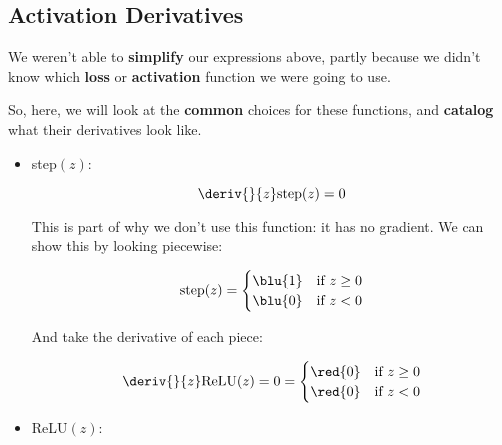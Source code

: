     \subsection*{Activation Derivatives}
    
        We weren't able to \textbf{simplify} our expressions above, partly because we didn't know which \textbf{loss} or \textbf{activation} function we were going to use.
        
        So, here, we will look at the \textbf{common} choices for these functions, and \textbf{catalog} what their derivatives look like.
        
        \begin{itemize}
            \item {} step$(z)$:
            
                \begin{equation}
                    \deriv{}{z} \text{step}(z) = 0
                \end{equation}
                
                This is part of why we don't use this function: it has no gradient. We can show this by looking piecewise:
                
                \begin{equation}
                    \text{step}(z) 
                    =
                    \begin{cases}
                      \blu{1} & \text{if $z \geq 0$}\\
                      \blu{0} & \text{if $z < 0$}
                    \end{cases}
                \end{equation}
                
                And take the derivative of each piece:
                
                \begin{equation}
                    \deriv{}{z} \text{ReLU}(z)
                    =
                    0
                    =
                    \begin{cases}
                      \red{0} & \text{if $z \geq 0$}\\
                      \red{0} & \text{if $z < 0$}
                    \end{cases}
                \end{equation}
        
            \item {} ReLU$(z)$:
            

\end{itemize}
